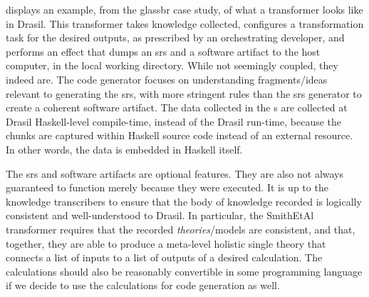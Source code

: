 
 displays an example, from the
\acs{glassbr} case study, of what a transformer looks like in Drasil. This
transformer takes knowledge collected, configures a transformation task for the
desired outputs, as prescribed by an orchestrating developer, and performs an
 effect that dumps an \acs{srs} and a software artifact to the
host computer, in the local working directory. While not seemingly coupled, they
indeed are. The code generator focuses on understanding fragments/ideas relevant
to generating the \acs{srs}, with more stringent rules than the \acs{srs}
generator to create a coherent software artifact. The data collected in the
\ChunkDB{}s are collected at Drasil Haskell-level compile-time, instead of the
Drasil run-time, because the chunks are captured within Haskell source code
instead of an external resource. In other words, the data is embedded in Haskell
itself.





The \acs{srs} and software artifacts are optional features. They are also not
always guaranteed to function merely because they were executed. It is up to the
knowledge transcribers to ensure that the body of knowledge recorded is
logically consistent and well-understood to Drasil. In particular, the SmithEtAl
transformer requires that the recorded \textit{theories}/models are consistent,
and that, together, they are able to produce a meta-level holistic single theory
that connects a list of inputs to a list of outputs of a desired calculation.
The calculations should also be reasonably convertible in some programming
language if we decide to use the calculations for code generation as well.


\caseStudiesCodeTable


